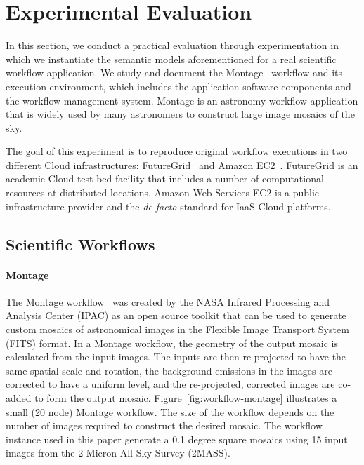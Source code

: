 \section{Experimental Evaluation}
\label{sec:experiment}

In this section, we conduct a practical evaluation through experimentation in which we instantiate the semantic models aforementioned for a real scientific workflow application. We study and document the Montage~\cite{Montage} workflow and its execution environment, which includes the application software components and the workflow management system. Montage is an astronomy workflow application that is widely used by many astronomers to construct large image mosaics of the sky.

The goal of this experiment is to reproduce original workflow executions in two different 
Cloud infrastructures: FutureGrid~\cite{futuregrid} and Amazon EC2~\cite{aws}. 
FutureGrid is an academic Cloud test-bed facility that includes a number of computational 
resources at distributed locations. Amazon Web Services EC2 is a public infrastructure 
provider and the \emph{de facto} standard for IaaS Cloud platforms.


\subsection{Scientific Workflows}

\paragraph{\textbf{Montage}}
The Montage workflow~\cite{Montage} was created by the NASA Infrared Processing 
and Analysis Center (IPAC) as an open source toolkit that can be used to generate 
custom mosaics of astronomical images in the Flexible Image Transport System (FITS) 
format. In a Montage workflow, the geometry of the output mosaic is calculated from the 
input images. The inputs are then re-projected to have the same spatial scale and rotation, 
the background emissions in the images are corrected to have a uniform level, and the 
re-projected, corrected images are co-added to form the output mosaic. 
Figure~\ref{fig:workflow-montage} illustrates a small (20 node) Montage workflow. The 
size of the workflow depends on the number of images required to construct the desired 
mosaic. The workflow instance used in this paper generate a 0.1 degree square mosaics 
using 15 input images from the 2 Micron All Sky Survey (2MASS).

